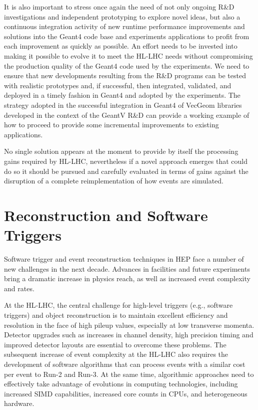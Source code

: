 \documentclass[10pt,a4paper]{article}
\begin{document}
It is also important to stress once again the need of not only ongoing
R\&D investigations and independent prototyping to explore novel ideas,
but also a continuous integration activity of new runtime performance
improvements and solutions into the Geant4 code base and experiments
applications to profit from each improvement as quickly as possible. An
effort needs to be invested into making it possible to evolve it to meet
the HL-LHC needs without compromising the production quality of the
Geant4 code used by the experiments. We need to ensure that new
developments resulting from the R\&D programs can be tested with
realistic prototypes and, if successful, then integrated, validated, and
deployed in a timely fashion in Geant4 and adopted by the experiments.
The strategy adopted in the successful integration in Geant4 of VecGeom
libraries developed in the context of the GeantV R\&D can provide a
working example of how to proceed to provide some incremental
improvements to existing applications.

No single solution appears at the moment to provide by itself the
processing gains required by HL-LHC, nevertheless if a novel approach
emerges that could do so it should be pursued and carefully evaluated in
terms of gains against the disruption of a complete reimplementation of
how events are simulated.

\hypertarget{reconstruction-and-software-triggers}{%
\section{Reconstruction and Software
Triggers}\label{reconstruction-and-software-triggers}}

Software trigger and event reconstruction techniques in HEP face a
number of new challenges in the next decade. Advances in facilities and
future experiments bring a dramatic increase in physics reach, as well
as increased event complexity and rates.

At the HL-LHC, the central challenge for high-level triggers (e.g.,
software triggers) and object reconstruction is to maintain excellent
efficiency and resolution in the face of high pileup values, especially
at low transverse momenta. Detector upgrades such as increases in
channel density, high precision timing and improved detector layouts are
essential to overcome these problems. The subsequent increase of event
complexity at the HL-LHC also requires the development of software
algorithms that can process events with a similar cost per event to
Run-2 and Run-3. At the same time, algorithmic approaches need to
effectively take advantage of evolutions in computing technologies,
including increased SIMD capabilities, increased core counts in CPUs,
and heterogeneous hardware.
\end{document}
